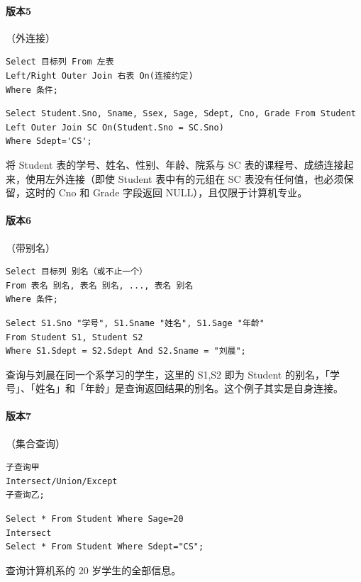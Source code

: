 \documentclass[UTF8]{ctexart}
\begin{document}
\paragraph{版本5}（外连接）
\begin{lstlisting}
Select 目标列 From 左表
Left/Right Outer Join 右表 On(连接约定)
Where 条件;
\end{lstlisting}

\begin{lstlisting}[backgroundcolor=\color{white}]
Select Student.Sno, Sname, Ssex, Sage, Sdept, Cno, Grade From Student
Left Outer Join SC On(Student.Sno = SC.Sno)
Where Sdept='CS';
\end{lstlisting}
将 Student 表的学号、姓名、性别、年龄、院系与 SC 表的课程号、成绩连接起来，使用左外连接（即使 Student 表中有的元组在 SC 表没有任何值，也必须保留，这时的 Cno 和 Grade 字段返回 NULL），且仅限于计算机专业。


\paragraph{版本6}（带别名）
\begin{lstlisting}
Select 目标列 别名（或不止一个）
From 表名 别名, 表名 别名, ..., 表名 别名
Where 条件;
\end{lstlisting}

\begin{lstlisting}[backgroundcolor=\color{white}]
Select S1.Sno "学号", S1.Sname "姓名", S1.Sage "年龄"
From Student S1, Student S2
Where S1.Sdept = S2.Sdept And S2.Sname = "刘晨";
\end{lstlisting}
查询与刘晨在同一个系学习的学生，这里的 S1,S2 即为 Student 的别名，「学号」、「姓名」和「年龄」是查询返回结果的别名。这个例子其实是自身连接。


\paragraph{版本7}（集合查询）
\begin{lstlisting}
子查询甲
Intersect/Union/Except
子查询乙;
\end{lstlisting}

\begin{lstlisting}[backgroundcolor=\color{white}]
Select * From Student Where Sage=20
Intersect
Select * From Student Where Sdept="CS";
\end{lstlisting}
查询计算机系的 20 岁学生的全部信息。
\end{document}
